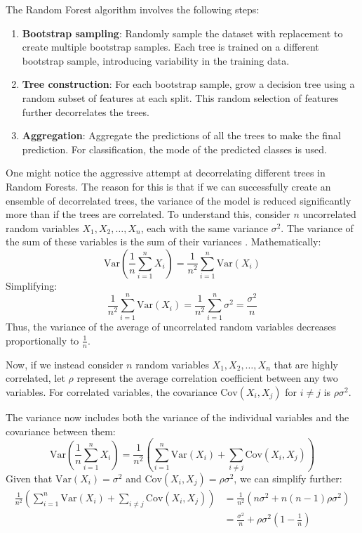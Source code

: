 \documentclass[english,11pt,a4paper,titlepage]{article}
\begin{document}
	The Random Forest algorithm involves the following steps:
	\begin{enumerate}
		\item \textbf{Bootstrap sampling}: Randomly sample the dataset with replacement to create multiple bootstrap samples. Each tree is trained on a different bootstrap sample, introducing variability in the training data.
		\item \textbf{Tree construction}: For each bootstrap sample, grow a decision tree using a random subset of features at each split. This random selection of features further decorrelates the trees.
		\item \textbf{Aggregation}: Aggregate the predictions of all the trees to make the final prediction. For classification, the mode of the predicted classes is used.
	\end{enumerate}
	
	One might notice the aggressive attempt at decorrelating different trees in Random Forests. The reason for this is that if we can successfully create an ensemble of decorrelated trees, the variance of the model is reduced significantly more than if the trees are correlated. To understand this, consider \( n \) uncorrelated random variables \( X_1, X_2, \ldots, X_n \), each with the same variance \( \sigma^2 \). The variance of the sum of these variables is the sum of their variances \cite{moodIntroductionTheoryStatistics1973}. Mathematically:
	\begin{equation*}
		\text{Var}\left(\frac{1}{n} \sum_{i=1}^{n} X_i \right) = \frac{1}{n^2} \sum_{i=1}^{n} \text{Var}(X_i)
	\end{equation*}
	Simplifying:
	\begin{equation*}
		\frac{1}{n^2} \sum_{i=1}^{n} \text{Var}(X_i) = \frac{1}{n^2} \sum_{i=1}^{n} \sigma^2 = \frac{\sigma^2}{n}
	\end{equation*}
	Thus, the variance of the average of uncorrelated random variables decreases proportionally to \( \frac{1}{n} \).
	
	Now, if we instead consider \( n \) random variables \( X_1, X_2, \ldots, X_n \) that are highly correlated, let \( \rho \) represent the average correlation coefficient between any two variables.  For correlated variables, the covariance \( \text{Cov}(X_i, X_j) \) for \( i \neq j \) is \( \rho \sigma^2 \). 
	
	The variance now includes both the variance of the individual variables and the covariance between them:
	\begin{equation*}
		\text{Var}\left(\frac{1}{n}\sum_{i=1}^{n}X_i\right) = \frac{1}{n^2} \left(\sum_{i=1}^{n} \text{Var}(X_i) + \sum_{i \neq j} \text{Cov}(X_i, X_j)\right)
	\end{equation*}
	Given that \( \text{Var}(X_i) = \sigma^2 \) and \( \text{Cov}(X_i, X_j) = \rho \sigma^2 \), we can simplify further:
	\begin{align*}
		\frac{1}{n^2} \left(\sum_{i=1}^{n} \text{Var}(X_i) + \sum_{i \neq j} \text{Cov}(X_i, X_j)\right) &= \frac{1}{n^2}(n\sigma^2 + n(n-1)\rho\sigma^2) \\
		&= \frac{\sigma^2}{n} + \rho\sigma^2\left(1 - \frac{1}{n}\right)
	\end{align*}
	
\end{document}
